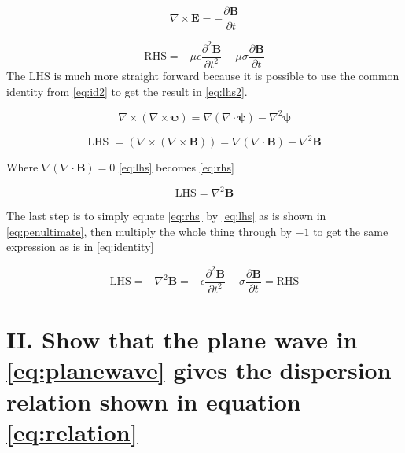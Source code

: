 \documentclass[12pt]{article}
\begin{document}
\begin{equation}
\label{eq:maxwell3}
\nabla \times \mathbf{E} = - \frac{\partial \mathbf{B}} {\partial t}
\end{equation}

\begin{equation}
\label{eq:rhs}
\text{RHS}=-\mu\epsilon\frac{\partial^{2} \mathbf{B}} {\partial t^{2}} - \mu\sigma\frac{\partial \mathbf{B}} {\partial t}
\end{equation}
The LHS is much more straight forward because it is possible to use the common identity from \cref{eq:id2} to get the result in \cref{eq:lhs2}.

\begin{equation}
\label{eq:id2}
\nabla \times \left( \nabla \times \mathbf{\psi} \right) = \nabla(\nabla \cdot \mathbf{\psi}) - \nabla^{2}\mathbf{\psi}
\end{equation}

\begin{equation}
\label{eq:lhs}
\text{LHS }=(\nabla \times (\nabla \times \mathbf{B} ))=\nabla(\nabla\cdot\mathbf{B})-\nabla^{2}\mathbf{B}
\end{equation}

\noindent
Where $\nabla(\nabla\cdot\mathbf{B})=0$ \cref{eq:lhs} becomes \cref{eq:rhs}

\begin{equation}
\label{eq:lhs2}
\text{LHS}=\nabla^{2}\mathbf{B}
\end{equation}

\noindent
The last step is to simply equate \cref{eq:rhs} by  \cref{eq:lhs} as is shown in \cref{eq:penultimate}, then multiply the whole thing through by $-1$ to get the same expression as is in \cref{eq:identity}

\begin{equation}
\label{eq:penultimate}
\text{LHS}=-\nabla^{2}\mathbf{B}=-\epsilon\frac{\partial^{2}\mathbf{B}} {\partial t^{2}} - \sigma\frac{\partial \mathbf{B}} {\partial t}=\text{RHS}
\end{equation}



\section*{II. Show that the plane wave in \cref{eq:planewave} gives the dispersion relation shown in equation \cref{eq:relation}}
\end{document}
